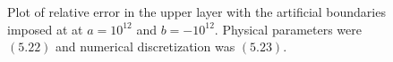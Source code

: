 \begin{figure}[H]
\vspace{3mm}
\caption{Plot of relative error in the upper layer with the artificial boundaries imposed at at $a=10^{12}$ and $b=-10^{12}$. Physical parameters were $(5.22)$ and numerical discretization was $(5.23)$.}
\label{Fig:Eps}
\end{figure}


